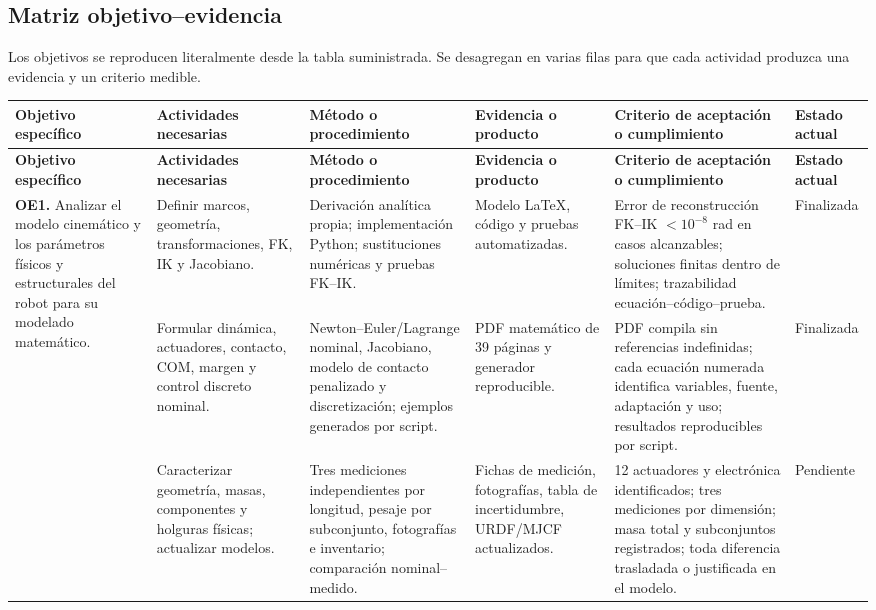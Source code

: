 \documentclass[10pt,letterpaper]{article}
\newcommand{\finalizada}{\cellcolor{verde}Finalizada}
\newcommand{\pendiente}{\cellcolor{gris}Pendiente}
\begin{document}
\begin{landscape}
\section{Matriz objetivo--evidencia}\label{sec:matriz}

Los objetivos se reproducen literalmente desde la tabla suministrada. Se desagregan en varias filas para que cada actividad produzca una evidencia y un criterio medible.

\scriptsize
\setlength{\tabcolsep}{3pt}
\begin{longtable}{p{3.6cm}p{3.7cm}p{4.2cm}p{3.6cm}p{5.0cm}p{1.6cm}}
\rowcolor{azul}
\color{white}\textbf{Objetivo específico} & \color{white}\textbf{Actividades necesarias} & \color{white}\textbf{Método o procedimiento} & \color{white}\textbf{Evidencia o producto} & \color{white}\textbf{Criterio de aceptación o cumplimiento} & \color{white}\textbf{Estado actual}\\
\endfirsthead
\rowcolor{azul}
\color{white}\textbf{Objetivo específico} & \color{white}\textbf{Actividades necesarias} & \color{white}\textbf{Método o procedimiento} & \color{white}\textbf{Evidencia o producto} & \color{white}\textbf{Criterio de aceptación o cumplimiento} & \color{white}\textbf{Estado actual}\\
\endhead
\multirow{3}{3.6cm}{\textbf{OE1.} Analizar el modelo cinemático y los parámetros físicos y estructurales del robot para su modelado matemático.}
& Definir marcos, geometría, transformaciones, FK, IK y Jacobiano. & Derivación analítica propia; implementación Python; sustituciones numéricas y pruebas FK--IK. & Modelo LaTeX, código y pruebas automatizadas. & Error de reconstrucción FK--IK $<10^{-8}$ rad en casos alcanzables; soluciones finitas dentro de límites; trazabilidad ecuación--código--prueba. & \finalizada\\
& Formular dinámica, actuadores, contacto, COM, margen y control discreto nominal. & Newton--Euler/Lagrange nominal, Jacobiano, modelo de contacto penalizado y discretización; ejemplos generados por script. & PDF matemático de 39 páginas y generador reproducible. & PDF compila sin referencias indefinidas; cada ecuación numerada identifica variables, fuente, adaptación y uso; resultados reproducibles por script. & \finalizada\\
& Caracterizar geometría, masas, componentes y holguras físicas; actualizar modelos. & Tres mediciones independientes por longitud, pesaje por subconjunto, fotografías e inventario; comparación nominal--medido. & Fichas de medición, fotografías, tabla de incertidumbre, URDF/MJCF actualizados. & 12 actuadores y electrónica identificados; tres mediciones por dimensión; masa total y subconjuntos registrados; toda diferencia trasladada o justificada en el modelo. & \pendiente\\[2pt]

\end{longtable}
\end{landscape}
\end{document}
